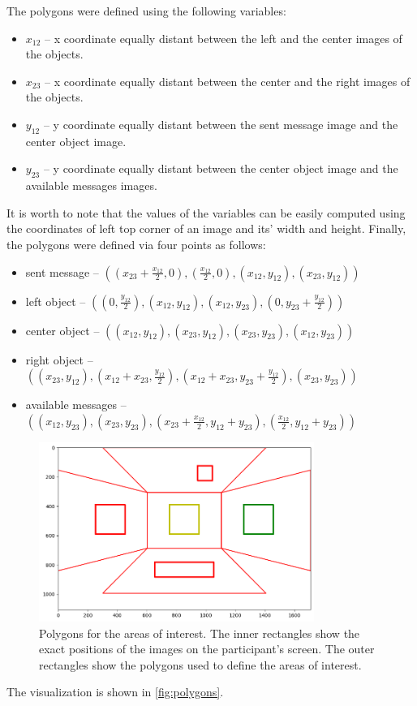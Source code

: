 The polygons were defined using the following variables: 
\begin{itemize}
    \item $x_{12}$ -- x coordinate equally distant between the left and the center images of the objects.
    \item $x_{23}$ -- x coordinate equally distant between the center and the right images of the objects.
    \item $y_{12}$ -- y coordinate equally distant between the sent message image and the center object image.
    \item $y_{23}$ -- y coordinate equally distant between the center object image and the available messages images.
\end{itemize}
It is worth to note that the values of the variables can be easily computed using the coordinates of left top corner of an image and its' width and height. Finally, the polygons were defined via four points as follows:
\begin{itemize}
    \item sent message -- $((x_{23}+\frac{x_{12}}{2}, 0), (\frac{x_{12}}{2}, 0), (x_{12}, y_{12}), (x_{23}, y_{12}))$
    \item left object  -- $((0, \frac{y_{12}}{2}), (x_{12}, y_{12}), (x_{12}, y_{23}), (0, y_{23}+\frac{y_{12}}{2}))$
    \item center object -- $((x_{12}, y_{12}), (x_{23}, y_{12}), (x_{23}, y_{23}), (x_{12}, y_{23}))$
    \item right object -- $((x_{23}, y_{12}), (x_{12}+x_{23}, \frac{y_{12}}{2}), (x_{12}+x_{23}, y_{23}+\frac{y_{12}}{2}), (x_{23}, y_{23}))$
    \item available messages -- $((x_{12}, y_{23}), (x_{23}, y_{23}), (x_{23}+\frac{x_{12}}{2}, y_{12}+y_{23}), (\frac{x_{12}}{2}, y_{12}+y_{23}))$
\end{itemize}
\begin{figure}
    \centering
    \includegraphics[width=0.8\textwidth]{images/polygons.png}
    \caption{Polygons for the areas of interest. The inner rectangles show the exact positions of the images on the participant's screen. The outer rectangles show the polygons used to define the areas of interest.}
    \label{fig:polygons}
\end{figure}
The visualization is shown in \autoref{fig:polygons}. 

